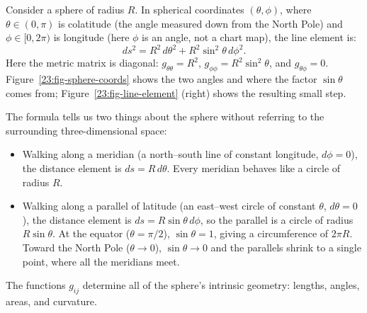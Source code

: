 \begin{example}
Consider a sphere of radius $R$. In spherical coordinates $(\theta, \phi)$, where $\theta \in (0, \pi)$ is colatitude (the angle measured down from the North Pole) and $\phi \in [0, 2\pi)$ is longitude (here $\phi$ is an angle, not a chart map), the line element is:
\[
ds^2 = R^2 \, d\theta^2 + R^2 \sin^2\theta \, d\phi^2.
\]
Here the metric matrix is diagonal: $g_{\theta\theta} = R^2$, $g_{\phi\phi} = R^2 \sin^2\theta$, and $g_{\theta\phi} = 0$. Figure~\ref{23:fig-sphere-coords} shows the two angles and where the factor $\sin\theta$ comes from; Figure~\ref{23:fig-line-element} (right) shows the resulting small step.

The formula tells us two things about the sphere without referring to the surrounding three-dimensional space:
\begin{itemize}
\item Walking along a meridian (a north--south line of constant longitude, $d\phi = 0$), the distance element is $ds = R \, d\theta$. Every meridian behaves like a circle of radius $R$.
\item Walking along a parallel of latitude (an east--west circle of constant $\theta$, $d\theta = 0$), the distance element is $ds = R \sin\theta \, d\phi$, so the parallel is a circle of radius $R\sin\theta$. At the equator ($\theta = \pi/2$), $\sin\theta = 1$, giving a circumference of $2\pi R$. Toward the North Pole ($\theta \to 0$), $\sin\theta \to 0$ and the parallels shrink to a single point, where all the meridians meet.
\end{itemize}
The functions $g_{ij}$ determine all of the sphere's intrinsic geometry: lengths, angles, areas, and curvature.
\end{example}


